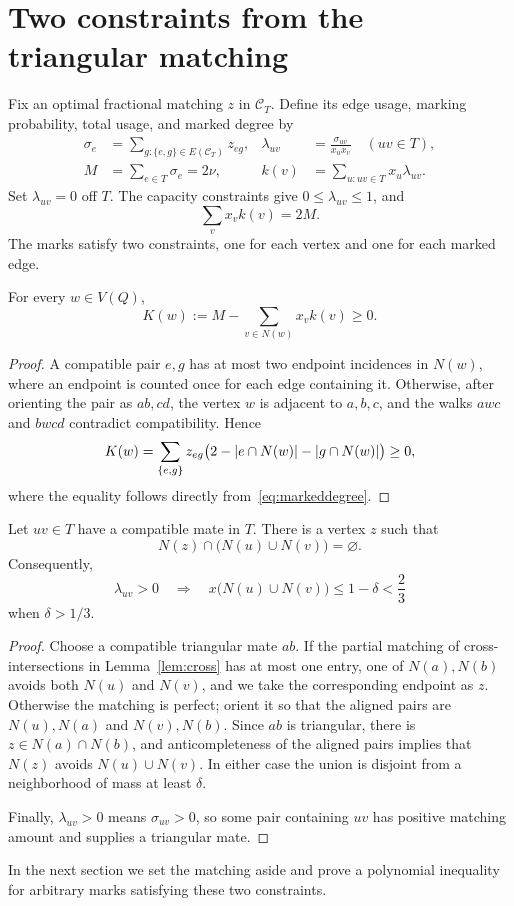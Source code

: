 \section{Two constraints from the triangular matching}\label{sec:matching}
Fix an optimal fractional matching $z$ in $\mathcal C_T$. Define its edge usage, marking probability, total usage, and marked degree by
\begin{align}
 \sigma_e&=\sum_{g:\{e,g\}\in E(\mathcal C_T)}z_{eg},
 &\lambda_{uv}&=\frac{\sigma_{uv}}{x_ux_v}\quad(uv\in T),\label{eq:marks}\\
 M&=\sum_{e\in T}\sigma_e=2\nu,
 &k(v)&=\sum_{u:uv\in T}x_u\lambda_{uv}.
 \label{eq:markeddegree}
\end{align}
Set $\lambda_{uv}=0$ off $T$. The capacity constraints give $0\le\lambda_{uv}\le1$, and
\[
 \sum_vx_vk(v)=2M.
\]
The marks satisfy two constraints, one for each vertex and one for each marked edge.

\begin{lemma}\label{lem:root}
For every $w\in V(Q)$,
\begin{equation}\label{eq:rootbudget}
 K(w):=M-\sum_{v\in N(w)}x_vk(v)\ge0.
\end{equation}
\end{lemma}
\begin{proof}
A compatible pair $e,g$ has at most two endpoint incidences in $N(w)$, where an endpoint is counted once for each edge containing it. Otherwise, after orienting the pair as $ab,cd$, the vertex $w$ is adjacent to $a,b,c$, and the walks $awc$ and $bwcd$ contradict compatibility. Hence
\[
 K(w)=\sum_{\{e,g\}}z_{eg}
 \bigl(2-\lvert e\cap N(w)\rvert-\lvert g\cap N(w)\rvert\bigr)\ge0,
\]
where the equality follows directly from~\eqref{eq:markeddegree}.
\end{proof}

\begin{lemma}\label{lem:union}
Let $uv\in T$ have a compatible mate in $T$. There is a vertex $z$ such that
\[
 N(z)\cap\bigl(N(u)\cup N(v)\bigr)=\varnothing.
\]
Consequently,
\begin{equation}\label{eq:union}
 \lambda_{uv}>0\quad\Longrightarrow\quad
 x\bigl(N(u)\cup N(v)\bigr)\le1-\delta<\frac23
\end{equation}
when $\delta>1/3$.
\end{lemma}
\begin{proof}
Choose a compatible triangular mate $ab$. If the partial matching of cross-intersections in Lemma~\ref{lem:cross} has at most one entry, one of $N(a),N(b)$ avoids both $N(u)$ and $N(v)$, and we take the corresponding endpoint as $z$. Otherwise the matching is perfect; orient it so that the aligned pairs are $N(u),N(a)$ and $N(v),N(b)$. Since $ab$ is triangular, there is $z\in N(a)\cap N(b)$, and anticompleteness of the aligned pairs implies that $N(z)$ avoids $N(u)\cup N(v)$. In either case the union is disjoint from a neighborhood of mass at least $\delta$.

Finally, $\lambda_{uv}>0$ means $\sigma_{uv}>0$, so some pair containing $uv$ has positive matching amount and supplies a triangular mate.
\end{proof}

In the next section we set the matching aside and prove a polynomial inequality for arbitrary marks satisfying these two constraints.
